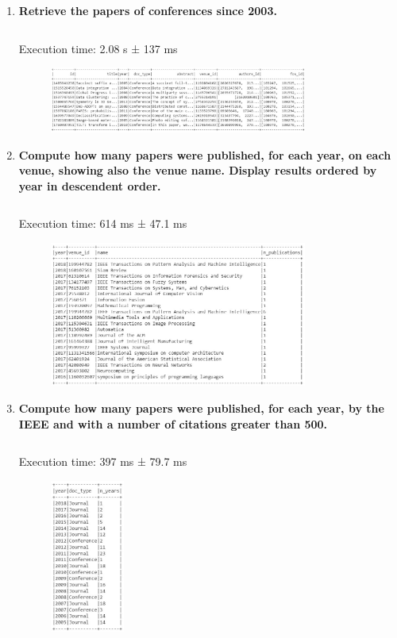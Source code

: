 \documentclass{Configuration_Files/PoliMi3i_thesis}
\begin{document}
\begin{enumerate}
    \item \textbf{Retrieve the papers of conferences since 2003.}
    \inputminted[linenos,tabsize=2,breaklines]{Python}{code/queries_spark/query_3.txt}
    Execution time: 2.08 s ± 137 ms
    \begin{figure}[H]
        \centering
         \includegraphics[width=0.8\textwidth]{Images/queries_spark/query_3.jpg}
    \end{figure} 
    
    \item \textbf{Compute how many papers were published, for each year, on each venue, showing also the venue name. Display results ordered by year in descendent order.}
    \inputminted[linenos,tabsize=2,breaklines]{Python}{code/queries_spark/query_4.txt}
    Execution time: 614 ms ± 47.1 ms
    \begin{figure}[H]
        \centering
         \includegraphics[width=0.8\textwidth]{Images/queries_spark/query_4.jpg}
    \end{figure} 
    
    \item \textbf{Compute how many papers were published, for each year, by the IEEE and with a number of citations greater than 500.}
    \inputminted[linenos,tabsize=2,breaklines]{Python}{code/queries_spark/query_5.txt}
    Execution time: 397 ms ± 79.7 ms
    \begin{figure}[H]
        \centering
         \includegraphics[width=0.23\textwidth]{Images/queries_spark/query_5.jpg}
    \end{figure} 
    

\end{enumerate}
\end{document}
